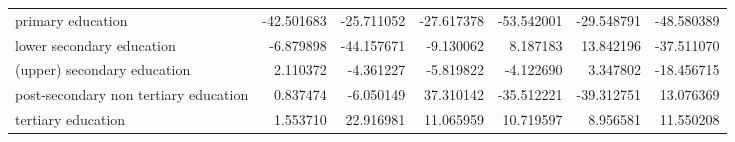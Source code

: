 \documentclass{article}
\begin{document}
\begin{table}[!htbp]
\begin{center}
{\begin{tabular}{lrrrrrr}
primary education                     & -42.501683 & -25.711052 &  -27.617378 & -53.542001 & -29.548791 & -48.580389 \\
lower secondary education             &  -6.879898 & -44.157671 &   -9.130062 &   8.187183 &  13.842196 & -37.511070 \\
(upper) secondary education           &   2.110372 &  -4.361227 &   -5.819822 &  -4.122690 &   3.347802 & -18.456715 \\
post-secondary non tertiary education &   0.837474 &  -6.050149 &   37.310142 & -35.512221 & -39.312751 &  13.076369 \\
tertiary education                    &   1.553710 &  22.916981 &   11.065959 &  10.719597 &   8.956581 &  11.550208 \\
\bottomrule
\end{tabular}

}
\end{center}
\end{table}
\end{document}
